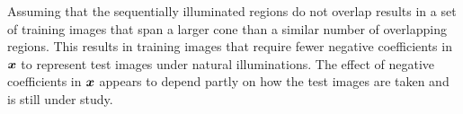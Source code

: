 \documentclass[12pt,journal,draftcls,letterpaper,onecolumn]{IEEEtran}
\begin{document}

Assuming that the sequentially illuminated regions do not overlap results in a
set of training images that span a larger cone than a similar number of
overlapping regions.  This results in training images that require fewer
negative coefficients in ${\boldsymbol{x}}$ to represent test images under natural
illuminations.  The effect of negative coefficients in ${\boldsymbol{x}}$ appears to depend
partly on how the test images are taken and is still under study.
\end{document}
